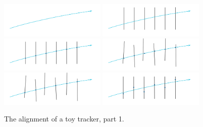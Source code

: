\begin{figure}[htb]
    \begin{center}
        \includegraphics[width=0.45\textwidth]{../figs/Alignment/toyTracker01.png}
        \includegraphics[width=0.45\textwidth]{../figs/Alignment/toyTracker02.png}
        \includegraphics[width=0.45\textwidth]{../figs/Alignment/toyTracker03.png}
        \includegraphics[width=0.45\textwidth]{../figs/Alignment/toyTracker04.png}
        \includegraphics[width=0.45\textwidth]{../figs/Alignment/toyTracker05.png}
        \includegraphics[width=0.45\textwidth]{../figs/Alignment/toyTracker06.png}
    \end{center}
    \caption{The alignment of a toy tracker, part 1.}
    \label{fig:toyTracker_part1}
\end{figure}


